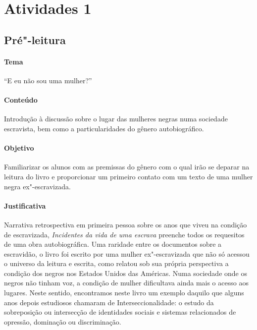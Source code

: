\documentclass[11pt]{extarticle}
\begin{document}
\tableofcontents


\section{Atividades 1}


\subsection{Pré"-leitura}

\paragraph{Tema} ``E eu não sou uma mulher?''

\paragraph{Conteúdo} Introdução à discussão sobre o lugar das mulheres negras
numa sociedade escravista, bem como a particularidades do gênero autobiográfico.

\paragraph{Objetivo} Familiarizar os alunos com as premissas do gênero com o qual
irão se deparar na leitura do livro e proporcionar um primeiro contato com um texto
de uma mulher negra ex"-escravizada.

\paragraph{Justificativa} Narrativa retrospectiva em primeira pessoa sobre os anos 
que viveu na condição de escravizada, \emph{Incidentes da vida de uma escrava} 
preenche todos os requesitos de uma obra autobiográfica. Uma raridade entre os 
documentos sobre a escravidão, o livro foi escrito por uma mulher ex"-escravizada 
que não só acessou o universo da leitura e escrita, como relatou sob sua própria perspectiva 
a condição dos negros nos Estados Unidos das Américas. 
Numa sociedade onde os negros não tinham voz, a condição de mulher dificultava ainda mais
o acesso aos lugares. Neste sentido, encontramos neste livro um exemplo daquilo que alguns anos
depois estudiosos chamaram de Interseccionalidade: o estudo da sobreposição ou intersecção de 
identidades sociais e sistemas relacionados de opressão, dominação ou discriminação.
\end{document}
